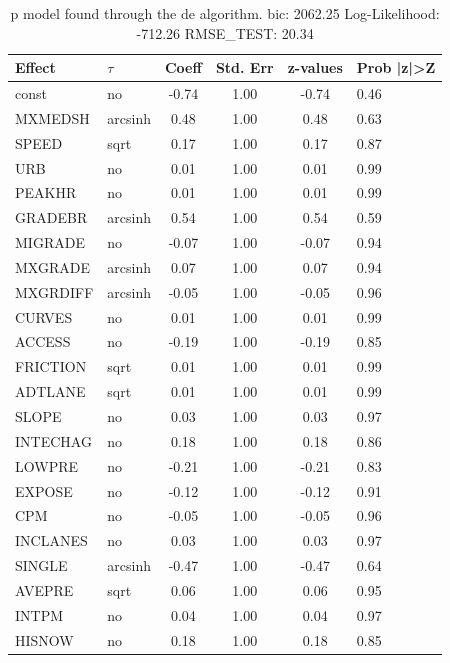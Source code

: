 \begin{table}
	\caption{p model found through the de algorithm. bic: 2062.25 Log-Likelihood: -712.26 RMSE_TEST: 20.34}
	\begin{center}
		\begin{tabular}{|l|l|c|c|c|l|}
			\hline
			Effect & $\tau$ & Coeff & Std. Err & z-values & Prob |z|>Z \\
			\hline
			const & no & -0.74 & 1.00 & -0.74 & 0.46 \\
			\hline
			MXMEDSH & arcsinh & 0.48 & 1.00 & 0.48 & 0.63 \\
			\hline
			SPEED & sqrt & 0.17 & 1.00 & 0.17 & 0.87 \\
			\hline
			URB & no & 0.01 & 1.00 & 0.01 & 0.99 \\
			\hline
			PEAKHR & no & 0.01 & 1.00 & 0.01 & 0.99 \\
			\hline
			GRADEBR & arcsinh & 0.54 & 1.00 & 0.54 & 0.59 \\
			\hline
			MIGRADE & no & -0.07 & 1.00 & -0.07 & 0.94 \\
			\hline
			MXGRADE & arcsinh & 0.07 & 1.00 & 0.07 & 0.94 \\
			\hline
			MXGRDIFF & arcsinh & -0.05 & 1.00 & -0.05 & 0.96 \\
			\hline
			CURVES & no & 0.01 & 1.00 & 0.01 & 0.99 \\
			\hline
			ACCESS & no & -0.19 & 1.00 & -0.19 & 0.85 \\
			\hline
			FRICTION & sqrt & 0.01 & 1.00 & 0.01 & 0.99 \\
			\hline
			ADTLANE & sqrt & 0.01 & 1.00 & 0.01 & 0.99 \\
			\hline
			SLOPE & no & 0.03 & 1.00 & 0.03 & 0.97 \\
			\hline
			INTECHAG & no & 0.18 & 1.00 & 0.18 & 0.86 \\
			\hline
			LOWPRE & no & -0.21 & 1.00 & -0.21 & 0.83 \\
			\hline
			EXPOSE & no & -0.12 & 1.00 & -0.12 & 0.91 \\
			\hline
			CPM & no & -0.05 & 1.00 & -0.05 & 0.96 \\
			\hline
			INCLANES & no & 0.03 & 1.00 & 0.03 & 0.97 \\
			\hline
			SINGLE & arcsinh & -0.47 & 1.00 & -0.47 & 0.64 \\
			\hline
			AVEPRE & sqrt & 0.06 & 1.00 & 0.06 & 0.95 \\
			\hline
			INTPM & no & 0.04 & 1.00 & 0.04 & 0.97 \\
			\hline
			HISNOW & no & 0.18 & 1.00 & 0.18 & 0.85 \\

\end{tabular}
\end{center}
\end{table}
